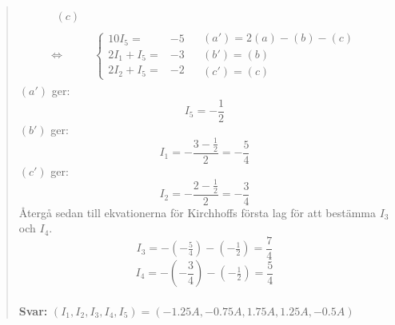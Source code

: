 \documentclass[a4paper]{article}
\begin{document}
\begin{quotation}
\begin{align*}
\begin{array}{l}
	(c)
	\end{array} \\ \Leftrightarrow
	&\left\{\begin{array}{rr}
	10I_5=&-5 \\
	2I_1+I_5=&-3 \\
	2I_2+I_5=&-2 
	\end{array}\right.
	&\begin{array}{l}
	(a')=2(a)-(b)-(c) \\
	(b')=(b) \\
	(c')=(c)
	\end{array}
	\end{align*}
	$(a')$ ger:
	\[I_5=-\frac{1}{2}\]
	$(b')$ ger:
	\[I_1=-\frac{3-\frac{1}{2}}{2}=-\frac{5}{4}\]
	$(c')$ ger:
	\[I_2=-\frac{2-\frac{1}{2}}{2}=-\frac{3}{4}\]
	Återgå sedan till ekvationerna för Kirchhoffs första lag för att bestämma $I_3$ och $I_4$.
	\[I_3=-(-\tfrac{5}{4})-(-\tfrac{1}{2})=\frac{7}{4}\]
	\[I_4=-(-\frac{3}{4})-(-\tfrac{1}{2})=\frac{5}{4}\]
	\\
	\textbf{Svar:} $(I_1,I_2,I_3,I_4,I_5)=(-1.25A,-0.75A,1.75A,1.25A,-0.5A)$
\end{quotation}
\end{document}
